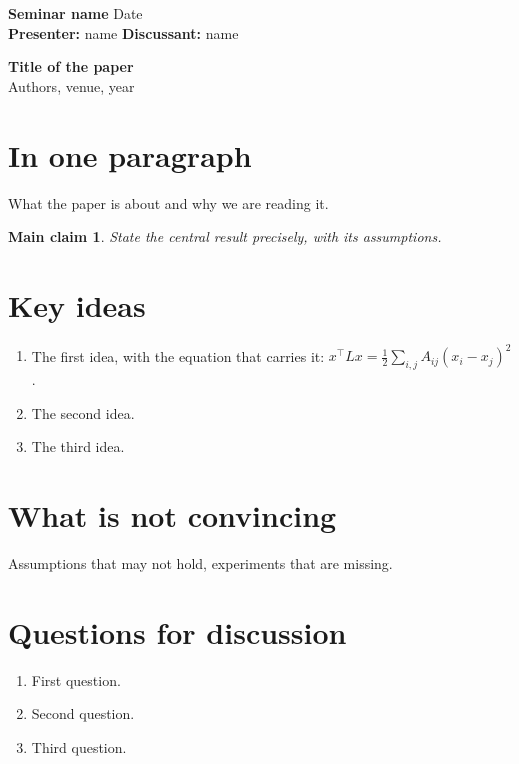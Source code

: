 \documentclass[11pt,a4paper]{article}
\newtheorem*{claim}{Main claim}
\begin{document}
\textbf{Seminar name} \hfill Date \\
\textbf{Presenter:} name \hfill \textbf{Discussant:} name

\begin{center}
  {\large \textbf{Title of the paper}} \\ Authors, venue, year
\end{center}

\section*{In one paragraph}
What the paper is about and why we are reading it.

\begin{claim}
State the central result precisely, with its assumptions.
\end{claim}

\section*{Key ideas}
\begin{enumerate}[leftmargin=1.5em]
  \item The first idea, with the equation that carries it: $x^\top L x = \tfrac{1}{2} \sum_{i,j} A_{ij} (x_i - x_j)^2$.
  \item The second idea.
  \item The third idea.
\end{enumerate}

\section*{What is not convincing}
Assumptions that may not hold, experiments that are missing.

\section*{Questions for discussion}
\begin{enumerate}[leftmargin=1.5em]
  \item First question.
  \item Second question.
  \item Third question.
\end{enumerate}
\end{document}
